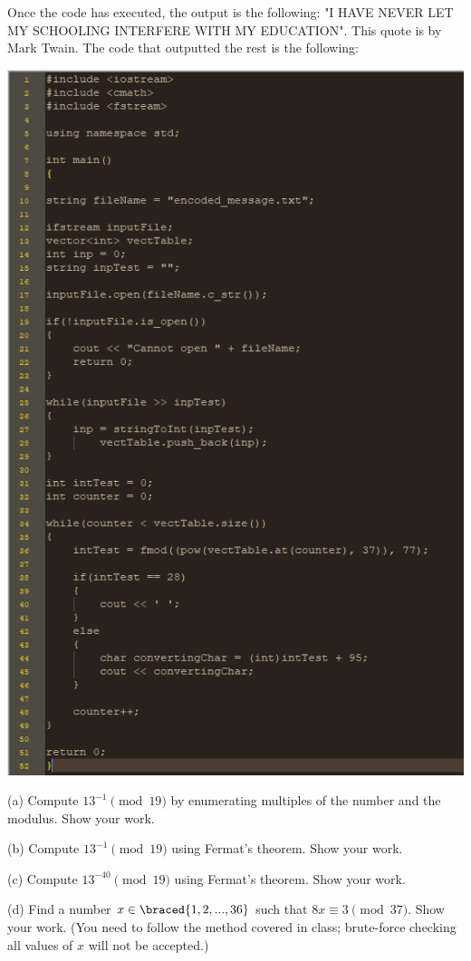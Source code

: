 \documentclass{article}
\begin{document}
\begin{solution}
Once the code has executed, the output is the following: 
\newline
"I HAVE NEVER LET MY SCHOOLING INTERFERE WITH MY EDUCATION".
This quote is by Mark Twain.
\newline
The code that outputted the rest is the following:
\begin{center}
		\includegraphics{files/codeblock.PNG}
\end{center}

\newline

\end{solution}

\bigskip
\begin{problem}
(a) Compute $13^{-1}\pmod{19}$ by enumerating multiples of the number and the modulus.
Show your work.

\smallskip\noindent
(b) Compute $13^{-1}\pmod{19}$ using Fermat's theorem. Show your work.

\smallskip\noindent
(c) Compute $13^{-40}\pmod{19}$ using Fermat's theorem. Show your work.

\smallskip\noindent
(d) Find a number $x\in\braced{1,2,...,36}$
	such that $8x \equiv 3 \pmod{37}$. Show your work.
	(You need to follow the method covered in class; brute-force checking
	all values of $x$ will not be accepted.)
\end{problem}
\end{document}
